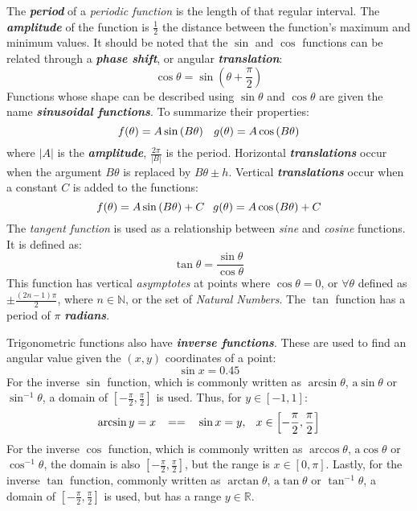 \vspace{0.1in}
The \textbf{\textit{period}} of a \textit{periodic function} is the length of that regular interval. The \textbf{\textit{amplitude}} of the function is $\frac{1}{2}$ the distance between the function's maximum and minimum values. It should be noted that the $\sin$ and $\cos$ functions can be related through a \textbf{\textit{phase shift}}, or angular \textbf{\textit{translation}}:
\begin{equation}
\cos \theta = \sin\left(\theta + \frac{\pi}{2}\right)
\end{equation}
Functions whose shape can be described using $\sin\theta$ and $\cos\theta$ are given the name \textbf{\textit{sinusoidal functions}}. To summarize their properties:
\begin{equation}
f(\theta) = A\sin\left(B\theta\right) \hphantom{-} g(\theta) = A \cos\left(B\theta\right)
\end{equation}
where $|A|$ is the \textbf{\textit{amplitude}}, $\frac{2\pi}{|B|}$ is the period. Horizontal \textbf{\textit{translations}} occur when the argument $B\theta$ is replaced by $B\theta \pm h$. Vertical \textbf{\textit{translations}} occur when a constant $C$ is added to the functions:
\begin{equation}
f(\theta) = A\sin\left(B\theta\right) + C \hphantom{-} g(\theta) = A \cos\left(B\theta\right) + C
\end{equation}
The \textit{tangent function} is used as a relationship between \textit{sine} and \textit{cosine} functions. It is defined as:
\begin{equation}
\tan\theta=\frac{\sin\theta}{\cos\theta}
\end{equation}
This function has vertical \textit{asymptotes} at points where $\cos\theta = 0$, or $\forall \theta$ defined as $\pm \frac{(2n-1)\pi}{2}$, where $n \in \mathbb{N}$, or the set of \textit{Natural Numbers}. The $\tan$ function has a period of $\pi$ \textbf{\textit{radians}}.

\vspace{0.1in}
Trigonometric functions also have \textbf{\textit{inverse functions}}. These are used to find an angular value given the $(x,y)$ coordinates of a point:
\begin{equation}
\sin x = 0.45
\end{equation}
For the inverse $\sin$ function, which is commonly written as $\arcsin\theta$, $\text{a}\sin\theta$ or $\sin^{-1}\theta$, a domain of $\left[-\frac{\pi}{2}, \frac{\pi}{2}\right]$ is used. Thus, for $y \in \left[-1, 1\right]$:
\begin{equation}
\arcsin y = x \hphantom{-} == \hphantom{-} \sin x = y, \hphantom{-} x\in \left[-\frac{\pi}{2}, \frac{\pi}{2}\right]
\end{equation}
For the inverse $\cos$ function, which is commonly written as $\arccos\theta$, $\text{a}\cos\theta$ or $\cos^{-1}\theta$, the domain is also $\left[-\frac{\pi}{2}, \frac{\pi}{2}\right]$, but the range is $x \in \left[0, \pi\right]$. Lastly, for the inverse $\tan$ function, commonly written as $\arctan\theta$, $\text{a}\tan\theta$ or $\tan^{-1}\theta$, a domain of $\left[-\frac{\pi}{2}, \frac{\pi}{2}\right]$ is used, but has a range $y \in \mathbb{R}$.

